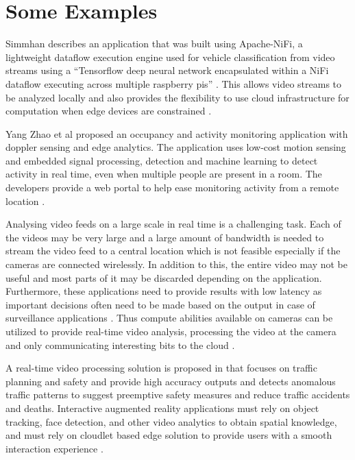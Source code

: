 \documentclass[sigconf]{acmart}
\begin{document}
\section{Some Examples}

Simmhan describes an application that was built using Apache-NiFi, a lightweight dataflow execution engine used for vehicle classification from video streams using a ``Tensorflow deep neural network encapsulated within a NiFi dataflow executing across multiple raspberry pis'' \cite{satyanarayananemergence}. This allows video streams to be analyzed locally and also provides the flexibility to use cloud infrastructure for computation when edge devices are constrained \cite{ieee-iot-cloud-analytics-newsletter}.

Yang Zhao et al proposed an occupancy and activity monitoring application with doppler sensing and edge analytics. The application uses low-cost motion sensing and embedded signal processing, detection and machine learning to detect activity in real time, even when multiple people are present in a room. The developers provide a web portal to help ease monitoring activity from a remote location \cite{Dolppler-usecase}.

Analysing video feeds on a large scale in real time is a challenging task. Each of the videos may be very large and a large amount of bandwidth is needed to stream the video feed to a central location which is not feasible especially if the cameras are connected wirelessly. In addition to this, the entire video may not be useful and most parts of it may be discarded depending on the application. Furthermore, these applications need to provide results with low latency as important decisions often need to be made based on the output in case of surveillance applications \cite{rocket-real-time-video}. Thus compute abilities available on cameras can be utilized to provide real-time video analysis, processing the video at the camera and only communicating interesting bits to the cloud \cite{satyanarayananemergence}.

A real-time video processing solution is proposed in \cite{rocket-real-time-video} that focuses on traffic planning and safety and provide high accuracy outputs and detects anomalous traffic patterns to suggest preemptive safety measures and reduce traffic accidents and deaths.
Interactive augmented reality applications must rely on object tracking, face detection, and other video analytics to obtain spatial knowledge, and must rely on cloudlet based edge solution to provide users with a smooth interaction experience \cite{rocket-real-time-video}.
\end{document}
